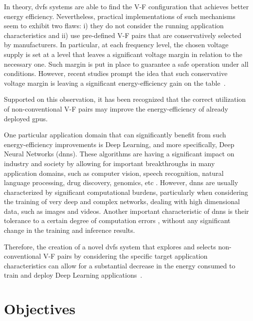 In theory, \acrshort{dvfs} systems are able to find the V-F configuration that achieves better energy efficiency. Nevertheless, practical implementations of such mechanisms seem to exhibit two flaws: i) they do not consider the running application characteristics and ii) use pre-defined V-F pairs that are conservatively selected by manufacturers. In particular, at each frequency level, the chosen voltage supply is set at a level that leaves a significant voltage margin in relation to the necessary one. Such margin is put in place to guarantee a safe operation under all conditions. However, recent studies prompt the idea that such conservative voltage margin is leaving a significant energy-efficiency gain on the table~\cite{leng_safe_2015}. 

Supported on this observation, it has been recognized that the correct utilization of non-conventional V-F pairs may improve the energy-efficiency of already deployed \acrshort{gpu}s.

One particular application domain that can significantly benefit from such energy-efficiency improvements is Deep Learning, and more specifically, Deep Neural Networks (\acrshort{dnn}s). These algorithms are having a significant impact on industry and society by allowing for important breakthroughs in many application domains, such as computer vision, speech recognition, natural language processing, drug discovery, genomics, etc \cite{shrestha_review_2019}. However, \acrshort{dnn}s are usually characterized by significant computational burdens, particularly when considering the training of very deep and complex networks, dealing with high dimensional data, such as images and videos. Another important characteristic of \acrshort{dnn}s is their tolerance to a certain degree of computation errors \cite{zhang_approxann_2015}, without any significant change in the training and inference results. 

Therefore, the creation of a novel \acrshort{dvfs} system that explores and selects non-conventional V-F pairs by considering the specific target application characteristics can allow for a substantial decrease in the energy consumed to train and deploy Deep Learning applications~\cite{tang_impact_2019}.






\section{Objectives}
\label{section:objectives}

